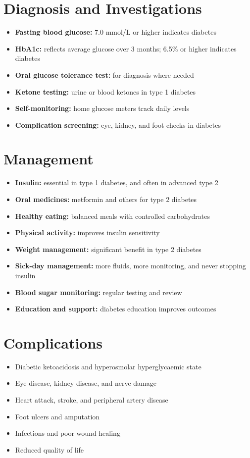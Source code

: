\section*{Diagnosis and Investigations}
\begin{itemize}
    \item \textbf{Fasting blood glucose:} 7.0 mmol/L or higher indicates diabetes
    \item \textbf{HbA1c:} reflects average glucose over 3 months; 6.5\% or higher indicates diabetes
    \item \textbf{Oral glucose tolerance test:} for diagnosis where needed
    \item \textbf{Ketone testing:} urine or blood ketones in type 1 diabetes
    \item \textbf{Self-monitoring:} home glucose meters track daily levels
    \item \textbf{Complication screening:} eye, kidney, and foot checks in diabetes
\end{itemize}

\section*{Management}
\begin{itemize}
    \item \textbf{Insulin:} essential in type 1 diabetes, and often in advanced type 2
    \item \textbf{Oral medicines:} metformin and others for type 2 diabetes
    \item \textbf{Healthy eating:} balanced meals with controlled carbohydrates
    \item \textbf{Physical activity:} improves insulin sensitivity
    \item \textbf{Weight management:} significant benefit in type 2 diabetes
    \item \textbf{Sick-day management:} more fluids, more monitoring, and never stopping insulin
    \item \textbf{Blood sugar monitoring:} regular testing and review
    \item \textbf{Education and support:} diabetes education improves outcomes
\end{itemize}

\section*{Complications}
\begin{itemize}
    \item Diabetic ketoacidosis and hyperosmolar hyperglycaemic state
    \item Eye disease, kidney disease, and nerve damage
    \item Heart attack, stroke, and peripheral artery disease
    \item Foot ulcers and amputation
    \item Infections and poor wound healing
    \item Reduced quality of life
\end{itemize}

